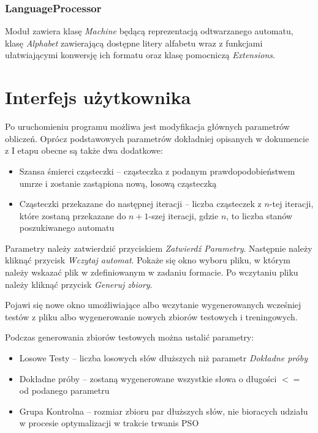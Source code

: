 \documentclass{../llncs_template/llncs}
\begin{document}
\subsubsection*{LanguageProcessor}
Moduł zawiera klasę \emph{Machine} będącą reprezentacją odtwarzanego automatu, klasę \emph{Alphabet} zawierającą dostępne litery alfabetu wraz z funkcjami ułatwiającymi konwersję ich formatu oraz klasę pomocniczą \emph{Extensions}.

\section{Interfejs użytkownika}
Po uruchomieniu programu możliwa jest modyfikacja głównych parametrów obliczeń. Oprócz podstawowych parametrów dokładniej opisanych w dokumencie z I etapu obecne są także dwa dodatkowe:

\begin{itemize}
\item Szansa śmierci cząsteczki -- cząsteczka z podanym prawdopodobieństwem umrze i zostanie zastąpiona nową, losową cząsteczką
\item Cząsteczki przekazane do następnej iteracji -- liczba cząsteczek z $n$-tej iteracji, które zostaną przekazane do $n+1$-szej iteracji, gdzie $n$, to liczba stanów poszukiwanego automatu
\end{itemize}

Parametry należy zatwierdzić przyciskiem \emph{Zatwierdź Parametry}. Następnie należy kliknąć przycisk \emph{Wczytaj automat}. Pokaże się okno wyboru pliku, w którym należy wskazać plik w zdefiniowanym w zadaniu formacie. Po wczytaniu pliku należy kliknąć przycisk \emph{Generuj zbiory}.

Pojawi się nowe okno umożliwiające albo wczytanie wygenerowanych wcześniej testów z pliku albo wygenerowanie nowych zbiorów testowych i treningowych.

\newpage

 Podczas generowania zbiorów testowych można ustalić parametry:

\begin{itemize}
\item Losowe Testy -- liczba losowych słów dłuższych niż parametr \emph{Dokładne próby}
\item Dokładne próby -- zostaną wygenerowane wszystkie słowa o długości $<=$ od podanego parametru
\item Grupa Kontrolna -- rozmiar zbioru par dłuższych słów, nie bioracych udziału w procesie optymalizacji w trakcie trwanis PSO
\end{itemize}
\end{document}
